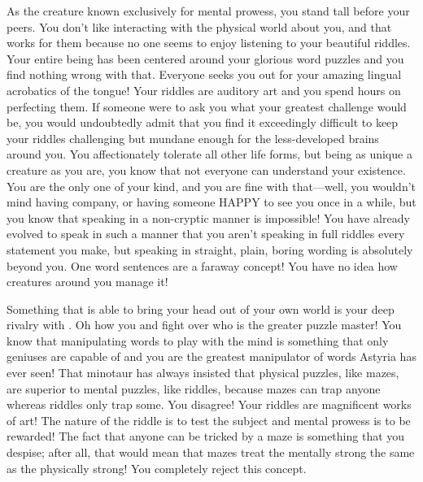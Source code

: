 \documentclass[char]{guildcamp2}
\begin{document}
\name{\cSphinx{}}


As the creature known exclusively for mental prowess, you stand tall before your peers. You don't like interacting with the physical world about you, and that works for them because no one seems to enjoy listening to your beautiful riddles. Your entire being has been centered around your glorious word puzzles and you find nothing wrong with that. Everyone seeks you out for your amazing lingual acrobatics of the tongue! Your riddles are auditory art and you spend hours on perfecting them. If someone were to ask you what your greatest challenge would be, you would undoubtedly admit that you find it exceedingly difficult to keep your riddles challenging but mundane enough for the less-developed brains around you. You affectionately tolerate all other life forms, but being as unique a creature as you are, you know that not everyone can understand your existence. You are the only one of your kind, and you are fine with that---well, you wouldn't mind having company, or having someone HAPPY  to see you once in a while, but you know that speaking in a non-cryptic manner is impossible! You have already evolved to speak in such a manner that you aren't speaking in full riddles every statement you make, but speaking in straight, plain, boring wording is absolutely beyond you. One word sentences are a faraway concept! You have no idea how creatures around you manage it!

Something that is able to bring your head out of your own world is your deep rivalry with \cMinotaur{}. Oh how you and \cMinotaur{\they} fight over who is the greater puzzle master! You know that manipulating words to play with the mind is something that only geniuses are capable of and you are the greatest manipulator of words Astyria has ever seen! That minotaur has always insisted that physical puzzles, like mazes, are superior to mental puzzles, like riddles, because mazes can trap anyone whereas riddles only trap some. You disagree! Your riddles are magnificent works of art! The nature of the riddle is to test the subject and mental prowess is to be rewarded! The fact that anyone can be tricked by a maze is something that you despise; after all, that would mean that mazes treat the mentally strong the same as the physically strong! You completely reject this concept. 
\end{document}
